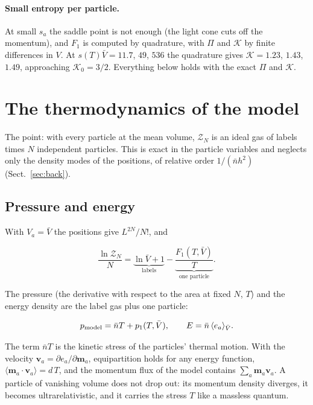 \documentclass[11pt,aps,preprint,nofootinbib,superscriptaddress,tightenlines]{revtex4-2}
\newcommand{\avg}[1]{\langle #1\rangle}
\def\st{\begin{equation}}
\def\stp{\end{equation}}
\def\Sect#1{Sect.~\ref{#1}}
\let\oldparagraph\paragraph
\renewcommand{\paragraph}{\par\bigskip\oldparagraph}
\begin{document}
\paragraph{Small entropy per particle.}  At small $s_a$ the saddle point is not enough (the light cone cuts off the momentum), and $F_1$ is computed by quadrature,
with $\Pi$ and $\mathcal K$ by finite differences in $V$.  At $s(T)\bar V=11.7$, $49$, $536$ the quadrature gives $\mathcal K=1.23$, $1.43$, $1.49$, approaching
$\mathcal K_0=3/2$.  Everything below holds with the exact $\Pi$ and $\mathcal K$.

\section{The thermodynamics of the model}
\label{sec:uniform}

The point: with every particle at the mean volume, $\mathcal Z_N$ is an ideal gas of labels times $N$ independent particles.  This is exact in the particle
variables and neglects only the density modes of the positions, of relative order $1/(\bar nh^2)$ (\Sect{sec:back}).

\subsection{Pressure and energy}
\label{sec:pe}

With $V_a=\bar V$ the positions give $L^{2N}/N!$, and
\begin{keyeq}
\st
\frac{\ln\mathcal Z_N}N=\underbrace{\ln\bar V+1}_{\text{labels}}-\underbrace{\frac{F_1(T,\bar V)}T}_{\text{one particle}} .
\label{lnZuniform}
\stp
\end{keyeq}
The pressure (the derivative with respect to the area at fixed $N$, $T$) and the energy density are the label gas plus one particle:
\begin{keyeq}
\st
p_{\rm model}=\bar nT+p_1(T,\bar V),\qquad E=\bar n\,\avg{e_a}_{\bar V} .
\label{pE}
\stp
\end{keyeq}
The term $\bar nT$ is the kinetic stress of the particles' thermal motion.  With the velocity $\bm v_a=\partial e_a/\partial\bm m_a$, equipartition holds for any
energy function, $\avg{\bm m_a\cdot\bm v_a}=d\,T$, and the momentum flux of the model contains $\sum_a\bm m_a\bm v_a$.  A particle of vanishing volume does not drop
out: its momentum density diverges, it becomes ultrarelativistic, and it carries the stress $T$ like a massless quantum.
\end{document}
